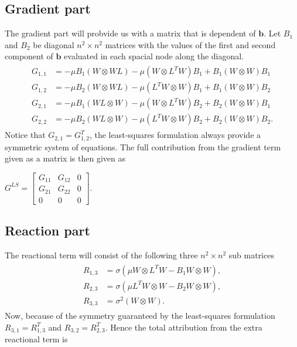 \subsection{Gradient part}
The gradient part will probvide us with a matrix that is dependent of $\mathbf{b}$. Let $B_1$ and $B_2$ be diagonal $n^2 \times n^2$ matrices with the values of the first and second component of $\mathbf{b}$ evaluated in each spacial node along the diagonal.  
\begin{align}
	\begin{split}
	G_{1,1} &= -\mu B_1 (W \otimes WL) -\mu( W \otimes L^TW) B_1 + B_1( W\otimes W) B_1 \\ 	
	G_{1,2} &= -\mu B_2 (W \otimes WL) -\mu (L^TW \otimes W) B_1 + B_1 (W\otimes W) B_2 \\
	G_{2,1} &= -\mu B_1 (WL \otimes W) -\mu (W \otimes L^TW) B_2 + B_2 (W\otimes W) B_1 \\
	G_{2,2} &= -\mu B_2 (WL \otimes W) -\mu (L^TW \otimes W) B_2 + B_2 (W\otimes W) B_2. 
	\end{split}
	\label{eq:additionalMatrixDiffTrans}
\end{align}
%
Notice that $G_{2,1} = G_{1,2}^T $, the least-squares formulation always provide a symmetric system of equations.
The full contribution from the gradient term given as a matrix is then given as  

$ G^{LS}=
\begin{bmatrix}
	G_{11} & G_{12} &0 \\
	G_{21} & G_{22} &0 \\
	0 & 0 & 0 
\end{bmatrix}.
$

\subsection{Reaction part}
The reactional term will consist of the following three $n^2 \times n^2$ sub matrices
\begin{align}
	\begin{split}
	R_{1,3} &= \sigma(\mu W\otimes L^T W - B_1 W\otimes W),\\
	R_{2,3} &= \sigma(\mu L^T W\otimes W - B_2 W\otimes W),\\
	R_{3,3} &= \sigma^2(W\otimes W).
	\end{split}
	\label{ReactionalTerm}
\end{align}
Now, because of the symmetry guaranteed by the least-squares formulation $R_{3,1}=R_{1,3}^T$ and $R_{3,2}=R_{2,3}^T$. Hence the total attribution from the extra reactional term is 

